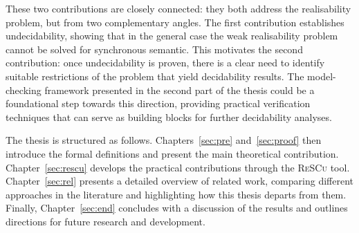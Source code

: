 These two contributions are closely connected: they both address the 
realisability problem, but from two complementary angles. The first 
contribution establishes undecidability, showing that in the general 
case the weak realisability problem cannot be solved for synchronous semantic. 
This motivates the second contribution: once undecidability is proven, 
there is a clear need to identify suitable restrictions of the problem 
that yield decidability results. The model-checking framework presented 
in the second part of the thesis could be a foundational step 
towards this direction, providing practical verification techniques that 
can serve as building blocks for further decidability analyses.

The thesis is structured as follows. 
Chapters~\ref{sec:pre} and~\ref{sec:proof} 
then introduce the formal definitions and present the main theoretical 
contribution. Chapter~\ref{sec:rescu} develops the practical 
contributions through the \textsc{ReSCu} tool. 
Chapter~\ref{sec:rel} presents 
a detailed overview of related work, comparing different approaches in 
the literature and highlighting how this thesis departs from them. Finally, 
Chapter~\ref{sec:end} concludes with a discussion of the results and 
outlines directions for future research and development.
